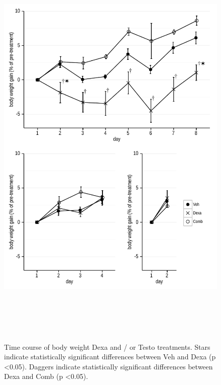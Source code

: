 \documentclass[12pt,english]{report}\usepackage[]{graphicx}\usepackage[]{color}
\newenvironment{knitrout}{}{} %
\begin{document}
\begin{figure}
\begin{knitrout}
\color{fgcolor}
\includegraphics[width=6in,height=8in]{figure/unnamed-chunk-2-1} 

\end{knitrout}

\protect\caption[Time course of body weight Dexa and / or Testo treatments.]{Time course of body weight Dexa and / or Testo treatments. Stars
indicate statistically significant differences between Veh and Dexa
(p <0.05). Daggers indicate statistically significant differences
between Dexa and Comb (p <0.05).\label{fig:Time-course-of}}
\end{figure}
\end{document}
